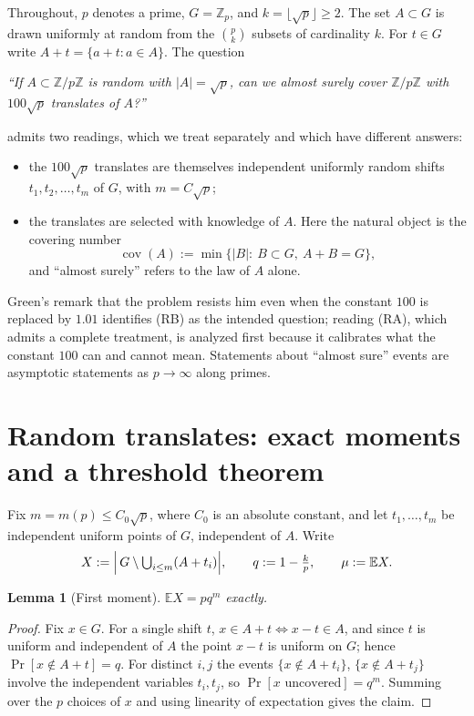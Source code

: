 \documentclass[11pt]{article}
\newtheorem{lemma}{Lemma}
\theoremstyle{definition}
\newcommand{\Zp}{\mathbb{Z}_p}
\newcommand{\E}{\mathbb{E}}
\newcommand{\Prob}{\Pr}
\newcommand{\cov}{\operatorname{cov}}
\begin{document}
Throughout, $p$ denotes a prime, $G=\Zp$, and $k=\lfloor\sqrt p\rfloor\ge2$.
The set $A\subset G$ is drawn uniformly at random from the
$\binom pk$ subsets of cardinality $k$. For $t\in G$ write
$A+t=\{a+t: a\in A\}$. The question

\begin{center}
\emph{``If $A\subset\mathbb Z/p\mathbb Z$ is random with $|A|=\sqrt p$, can we
almost surely cover $\mathbb Z/p\mathbb Z$ with $100\sqrt p$ translates of
$A$?''}
\end{center}

\noindent admits two readings, which we treat separately and which have
different answers:

\begin{itemize}
\item[\textbf{(RA)}] the $100\sqrt p$ translates are themselves independent
uniformly random shifts $t_1,t_2,\dots,t_m$ of $G$, with $m=C\sqrt p$;
\item[\textbf{(RB)}] the translates are selected with knowledge of $A$. Here
the natural object is the covering number
\[
\cov(A):=\min\{|B| :\ B\subset G,\ A+B=G\},
\]
and ``almost surely'' refers to the law of $A$ alone.
\end{itemize}

Green's remark that the problem resists him even when the constant $100$ is
replaced by $1.01$ identifies (RB) as the intended question; reading (RA),
which admits a complete treatment, is analyzed first because it calibrates
what the constant $100$ can and cannot mean. Statements about ``almost sure''
events are asymptotic statements as $p\to\infty$ along primes.

\section{Random translates: exact moments and a threshold theorem}\label{sec:RA}

Fix $m=m(p)\le C_0\sqrt p$, where $C_0$ is an absolute constant, and let
$t_1,\dots,t_m$ be independent uniform points of $G$, independent of $A$.
Write
\[
X:=\Bigl|\,G\setminus\textstyle\bigcup_{i\le m}(A+t_i)\Bigr|,
\qquad q:=1-\frac kp,\qquad \mu:=\E X .
\]

\begin{lemma}[First moment]\label{lem:first}
$\E X=pq^m$ exactly.
\end{lemma}

\begin{proof}
Fix $x\in G$. For a single shift $t$,
$x\in A+t\iff x-t\in A$, and since $t$ is uniform and independent of $A$ the
point $x-t$ is uniform on $G$; hence $\Prob[x\notin A+t]=q$. For distinct
$i,j$ the events $\{x\notin A+t_i\}$, $\{x\notin A+t_j\}$ involve the
independent variables $t_i,t_j$, so
$\Prob[x\text{ uncovered}]=q^m$. Summing over the $p$ choices of $x$ and using
linearity of expectation gives the claim.
\end{proof}
\end{document}
